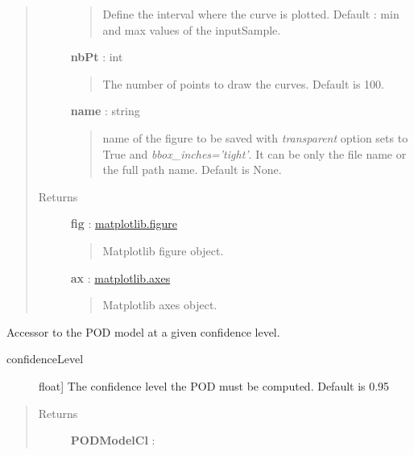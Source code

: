 \documentclass[letterpaper,10pt,english]{sphinxmanual}
\begin{document}
\begin{fulllineitems}
\begin{fulllineitems}
\begin{quote}
\begin{description}
\begin{quote}
Define the interval where the curve is plotted. Default : min and
max values of the inputSample.
\end{quote}

\textbf{nbPt} : int
\begin{quote}

The number of points to draw the curves. Default is 100.
\end{quote}

\textbf{name} : string
\begin{quote}

name of the figure to be saved with \emph{transparent} option sets to True
and \emph{bbox\_inches='tight'}. It can be only the file name or the 
full path name. Default is None.
\end{quote}

\item[{Returns}] \leavevmode
\textbf{fig} : \href{http://matplotlib.org/api/figure\_api.html}{matplotlib.figure}
\begin{quote}

Matplotlib figure object.
\end{quote}

\textbf{ax} : \href{http://matplotlib.org/api/axes\_api.html}{matplotlib.axes}
\begin{quote}

Matplotlib axes object.
\end{quote}

\end{description}\end{quote}

\end{fulllineitems}


\begin{fulllineitems}
\label{_generated/otpod.UnivariateLinearModelPOD:otpod.UnivariateLinearModelPOD.getPODCLModel}
Accessor to the POD model at a given confidence level.
\begin{description}
\item[{confidenceLevel}] \leavevmode{[}float{]}
The confidence level the POD must be computed. Default is 0.95

\end{description}
\begin{quote}\begin{description}
\item[{Returns}] \leavevmode
\textbf{PODModelCl} : \href{http://doc.openturns.org/openturns-latest/sphinx/user\_manual/\_generated/openturns.NumericalMathFunction.html\#openturns.NumericalMathFunction}{}
\begin{quote}


\end{quote}
\end{description}
\end{quote}
\end{fulllineitems}
\end{fulllineitems}
\end{document}
